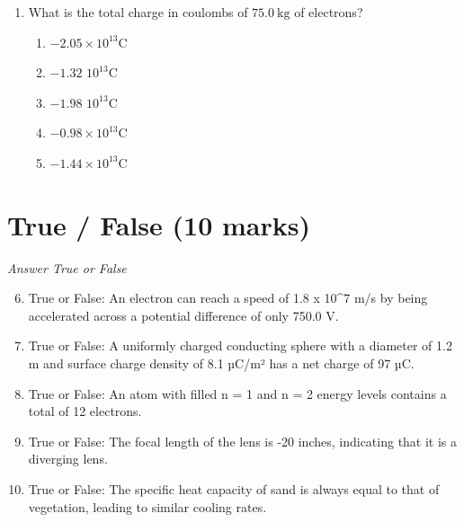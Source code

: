 \documentclass[12pt]{article}
\begin{document}
\begin{enumerate}[label=\arabic*.]
\begin{enumerate}[label=(\alph*)]
    \item \( \frac{h\omega}{4\pi} \)
    \item m\ensuremath{\omega}\^{}2/2
    \item \( \frac{h}{m\omega^2} \)
    \item \( \frac{h^2}{2\pi m \omega} \)
    \item h\^{}2/m\ensuremath{\omega}
\end{enumerate}
\item What is the total charge in coulombs of $75.0 \mathrm{~kg}$ of electrons?
\begin{enumerate}[label=(\alph*)]
    \item $-2.05 \times 10^{13} \mathrm{C}$
    \item $-1.32$ $10^{13} \mathrm{C}$
    \item $-1.98$ $10^{13} \mathrm{C}$
    \item $-0.98 \times 10^{13} \mathrm{C}$
    \item $-1.44 \times 10^{13} \mathrm{C}$
\end{enumerate}
\end{enumerate}

\section*{True / False (10 marks)}
\textit{Answer True or False}
\begin{enumerate}[label=\arabic*.]
\setcounter{enumi}{5}
\item True or False: An electron can reach a speed of 1.8 x 10\^{}7 m/s by being accelerated across a potential difference of only 750.0 V.
\item True or False: A uniformly charged conducting sphere with a diameter of 1.2 m and surface charge density of 8.1 µC/m² has a net charge of 97 µC.
\item True or False: An atom with filled n = 1 and n = 2 energy levels contains a total of 12 electrons.
\item True or False: The focal length of the lens is -20 inches, indicating that it is a diverging lens.
\item True or False: The specific heat capacity of sand is always equal to that of vegetation, leading to similar cooling rates.
\end{enumerate}
\end{document}
